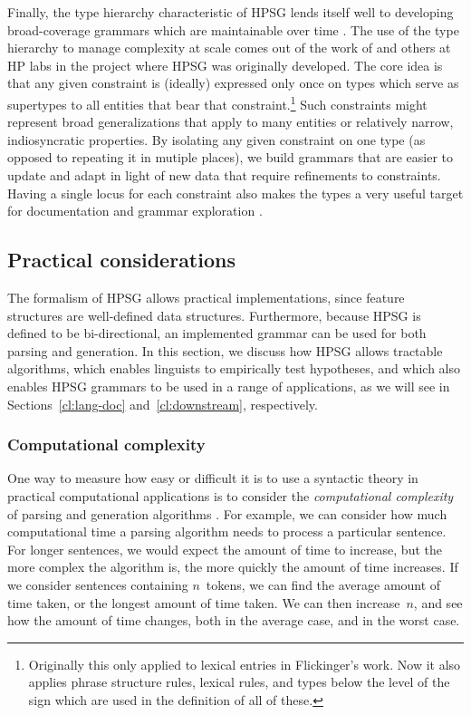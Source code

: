 \documentclass[output=paper]{langsci/langscibook}
\begin{document}
Finally, the type hierarchy characteristic of HPSG lends itself well to developing broad-coverage grammars which are maintainable over time \citep{FIXME-find-cite?}. The use of the type hierarchy to manage complexity at scale comes out of the work of \citet{Flickinger87} and others at HP labs in the project where HPSG was originally developed. The core idea is that any given constraint is (ideally) expressed only once on types which serve as supertypes to all entities that bear that constraint.\footnote{Originally this only applied to lexical entries in Flickinger's work. Now it also applies phrase structure rules, lexical rules, and types below the level of the sign which are used in the definition of all of these.} Such constraints might represent broad generalizations that apply to many entities or relatively narrow, indiosyncratic properties. By isolating any given constraint on one type (as opposed to repeating it in mutiple places), we build grammars that are easier to update and adapt in light of new data that require refinements to constraints. Having a single locus for each constraint also makes the types a very useful target for documentation \citep{FIXME:LTDB} and grammar exploration \citep{FIXME:typediff}. 


\subsection{Practical considerations}
\label{cl:prac}

The formalism of HPSG allows practical implementations,
since feature structures are well-defined data structures.
Furthermore, because HPSG is defined to be bi-directional,
an implemented grammar can be used for both parsing and generation.
In this section, we discuss how HPSG allows tractable algorithms,
which enables linguists to empirically test hypotheses,
and which also enables HPSG grammars to be used in a range of applications,
as we will see in Sections~\ref{cl:lang-doc} and~\ref{cl:downstream}, respectively.

\subsubsection{Computational complexity}
\label{cl:prac:comp}

One way to measure how easy or difficult it is to use a syntactic theory in practical computational applications
is to consider the \textit{computational complexity} of parsing and generation algorithms \cite{FIXME-Hopcroft-and-Ullman?}.
For example, we can consider how much computational time
a parsing algorithm needs to process a particular sentence.
For longer sentences, we would expect the amount of time to increase,
but the more complex the algorithm is,
the more quickly the amount of time increases.
If we consider sentences containing $n$~tokens,
we can find the average amount of time taken,
or the longest amount of time taken.
We can then increase~$n$, and see how the amount of time changes,
both in the average case, and in the worst case.
\end{document}
